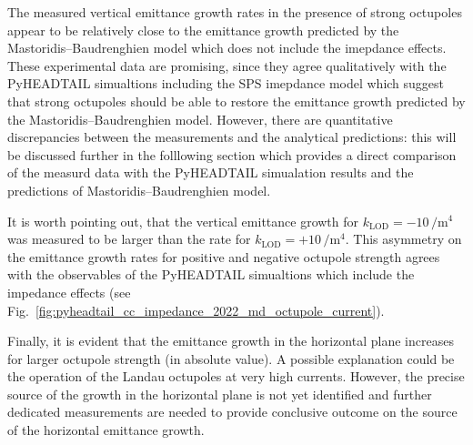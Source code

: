 The measured vertical emittance growth rates in the presence of strong octupoles appear to be relatively close to the emittance growth predicted by the Mastoridis--Baudrenghien model which does not include the imepdance effects. These experimental data are promising, since they agree qualitatively with the PyHEADTAIL simualtions including the SPS imepdance model which suggest that strong octupoles should be able to restore the emittance growth predicted by the Mastoridis--Baudrenghien model. However, there are quantitative discrepancies between the measurements and the analytical predictions: this will be discussed further in the folllowing section which provides a direct comparison of the measurd data with the PyHEADTAIL simualation results and the predictions of Mastoridis--Baudrenghien model.

It is worth pointing out, that the vertical emittance growth for $k_\mathrm{LOD}=-10$\,$\mathrm{/m^4}$ was measured to be larger than the rate for $k_\mathrm{LOD}=+10$\,$\mathrm{/m^4}$. This asymmetry on the emittance growth rates for positive and negative octupole strength agrees with the observables of the PyHEADTAIL simualtions which include the impedance effects (see Fig.~\ref{fig:pyheadtail_cc_impedance_2022_md_octupole_current}).

Finally, it is evident that the emittance growth in the horizontal plane increases for larger octupole strength (in absolute value). A possible explanation could be the operation of the Landau octupoles at very high currents. However, the precise source of the growth in the horizontal plane is not yet identified and further dedicated measurements are needed to provide conclusive outcome on the source of the horizontal emittance growth. 







